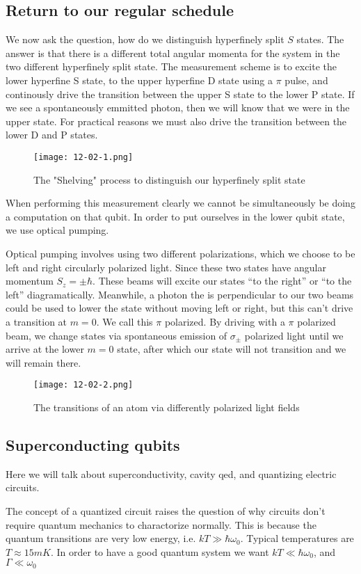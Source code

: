 \subsection*{Return to our regular schedule}
We now ask the question, how do we distinguish hyperfinely split $S$ states. The answer is that there is a different total angular momenta for the system in the two different hyperfinely split state.
The measurement scheme is to excite the lower hyperfine S state, to the upper hyperfine D state using a $\pi$ pulse, and continously drive the transition between the upper S state to the lower P state.
If we see a spontaneously emmitted photon, then we will know that we were in the upper state. For practical reasons we must also drive the transition between the lower D and P states.
\begin{figure*}[h]
	\centering
	\texttt{[image: 12-02-1.png]}
	\caption*{The "Shelving" process to distinguish our hyperfinely split state}
\end{figure*}
When performing this measurement clearly we cannot be simultaneously be doing a computation on that qubit.
In order to put ourselves in the lower qubit state, we use optical pumping. 

Optical pumping involves using two different polarizations, which we choose to be left and right circularly polarized light.
Since these two states have angular momentum $S_z = \pm\hbar$. These beams will excite our states ``to the right'' or ``to the left'' diagramatically.
Meanwhile, a photon the is perpendicular to our two beams could be used to lower the state without moving left or right, but this can't drive a transition at $m=0$. We call this $\pi$ polarized.
By driving with a $\pi$ polarized beam, we change states via spontaneous emission of $\sigma_\pm$ polarized light until we arrive at the lower $m=0$ state, after which our state will not transition and we will remain there.
\begin{figure*}[h]
	\centering
	\texttt{[image: 12-02-2.png]}
	\caption*{The transitions of an atom via differently polarized light fields}
\end{figure*}
\subsection{Superconducting qubits}
Here we will talk about superconductivity, cavity qed, and quantizing electric circuits.

The concept of a quantized circuit raises the question of why circuits don't require quantum mechanics to charactorize normally. This is because the quantum transitions are very low energy, i.e. $kT\gg \hbar\omega_0$. Typical temperatures are $T\approx 15mK$.
In order to have a good quantum system we want $kT \ll \hbar\omega_0$, and $\Gamma\ll\omega_0$


